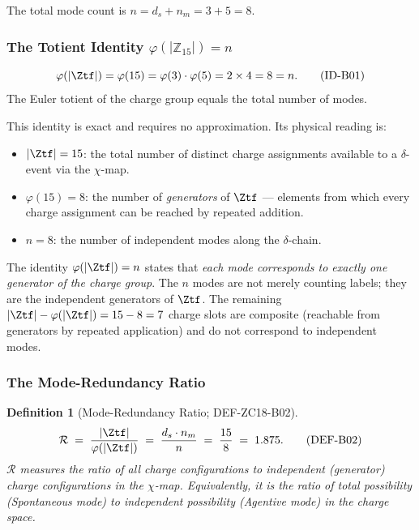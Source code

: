 \documentclass[12pt, a4paper]{article}
\newtheorem{definition}{Definition}[section]
\begin{document}
The total mode count is $n = d_s + n_m = 3 + 5 = 8$.

\subsubsection{The Totient Identity $\varphi(|\mathbb{Z}_{15}|) = n$}

\begin{formalbox}[title={Structural Identity ID-B01 (Exact)}]
\begin{equation}
  \varphi\!\left(|\Ztf|\right) = \varphi(15) = \varphi(3)\cdot\varphi(5)
  = 2\times 4 = 8 = n.
  \tag{ID-B01}\label{zc18b:eq:totient}
\end{equation}
The Euler totient of the charge group equals the total number of modes.
\end{formalbox}

\noindent
This identity is exact and requires no approximation.
Its physical reading is:
\begin{itemize}[leftmargin=*, noitemsep]
  \item $|\Ztf| = 15$: the total number of distinct charge assignments
    available to a $\delta$-event via the $\chi$-map.
  \item $\varphi(15) = 8$: the number of \emph{generators} of $\Ztf$ ---
    elements from which every charge assignment can be reached by repeated
    addition.
  \item $n = 8$: the number of independent modes along the $\delta$-chain.
\end{itemize}

The identity $\varphi(|\Ztf|) = n$ states that \emph{each mode
corresponds to exactly one generator of the charge group}.
The $n$ modes are not merely counting labels; they are the
independent generators of $\Ztf$.
The remaining $|\Ztf|-\varphi(|\Ztf|) = 15-8 = 7$ charge slots
are composite (reachable from generators by repeated application)
and do not correspond to independent modes.

\subsubsection{The Mode-Redundancy Ratio}

\begin{definition}[Mode-Redundancy Ratio; DEF-ZC18-B02]
\label{zc18b:def:mrr}
\begin{equation}
  \mathcal{R} \;=\; \frac{|\Ztf|}{\varphi(|\Ztf|)}
  \;=\; \frac{d_s \cdot n_m}{n}
  \;=\; \frac{15}{8}
  \;=\; 1.875.
  \tag{DEF-B02}\label{zc18b:eq:mrr}
\end{equation}
$\mathcal{R}$ measures the ratio of all charge configurations
to independent (generator) charge configurations in the $\chi$-map.
Equivalently, it is the ratio of total possibility (Spontaneous mode)
to independent possibility (Agentive mode) in the charge space.
\end{definition}
\end{document}
